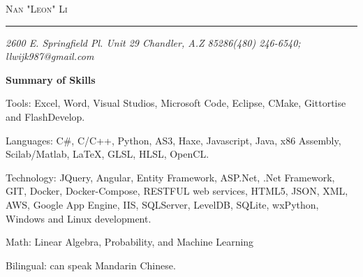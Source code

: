 \documentclass[10pt,oneside]{report}
\makeatletter
\newcommand{\name}{Nan "Leon" Li}
\newcommand{\addr}{2600 E. Springfield Pl. Unit 29 Chandler, A.Z 85286}
\newcommand{\phone}{(480) 246-6540}
\newcommand{\email}{llwijk987@gmail.com}
\newcommand{\website}{}
\newcommand{\bigname}[1]{
	\begin{center}\selectfont\Huge\scshape#1\end{center}
}
\newenvironment{ressection}[1]{
	\vspace{1pt}
  {\normalsize\textbf{#1}}
  
  \begin{itemize}
  \vspace{1pt}
}{
 	\end{itemize}
}
\newcommand{\resitem}[1]{
  \vspace{-5pt}
  \small
	\item \begin{flushleft} #1 \end{flushleft}
}
\makeatother
\begin{document}
\bigname{\name}
\vspace{1pt} \rule{\textwidth}{1pt}
\vspace{1pt} {\small\itshape \addr \hfill \phone; \email}
\vspace{8 pt}

\begin{ressection}{Summary of Skills}
  {
  \resitem{Tools: Excel, Word, Visual Studios, Microsoft Code, Eclipse, CMake, Gittortise and FlashDevelop.}
  \resitem{Languages: C\#, C/C++, Python, AS3, Haxe, Javascript, Java, x86 Assembly, Scilab/Matlab, \LaTeX, GLSL, HLSL, OpenCL.}
  \resitem{Technology: JQuery, Angular, Entity Framework, ASP.Net, .Net Framework, GIT, Docker, Docker-Compose, RESTFUL web services, HTML5, JSON, XML, AWS, Google App Engine, IIS, SQLServer, LevelDB, SQLite, wxPython, Windows and Linux development.}
  \resitem{Math: Linear Algebra, Probability, and Machine Learning}
  \resitem{Bilingual: can speak Mandarin Chinese.}
  }
\end{ressection}
\end{document}
